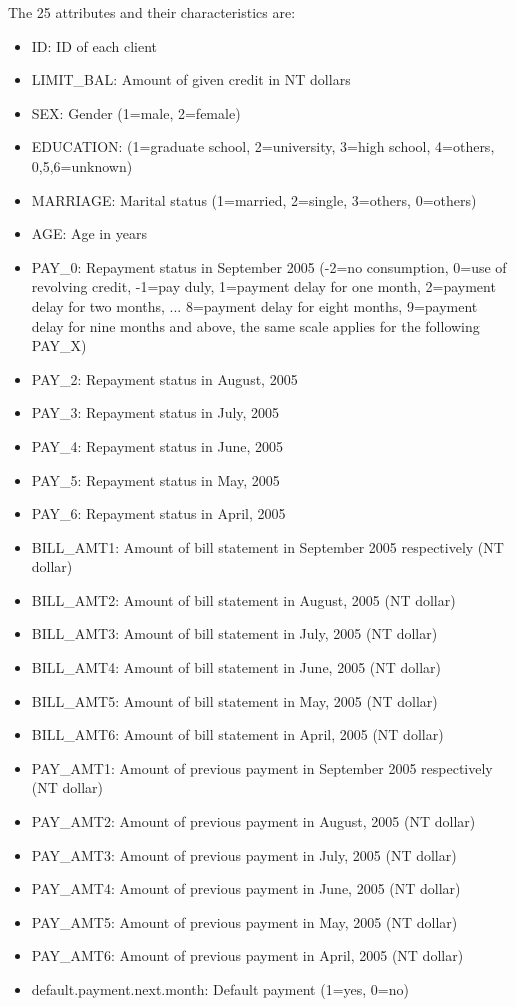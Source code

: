 \documentclass[fleqn,10pt]{SelfArx} %
\begin{document}
	The 25 attributes and their characteristics are:
	\begin{itemize}[noitemsep]
		\item ID: ID of each client
		\item LIMIT\_BAL: Amount of given credit in NT dollars
		\item SEX: Gender (1=male, 2=female)
		\item EDUCATION: (1=graduate school, 2=university, 3=high school, 4=others, 0,5,6=unknown)
		\item MARRIAGE: Marital status (1=married, 2=single, 3=others, 0=others)
		\item AGE: Age in years
		\item PAY\_0: Repayment status in September 2005 (-2=no consumption, 0=use of revolving credit, -1=pay duly, 1=payment delay for one month, 2=payment delay for two months, ... 8=payment delay for eight months, 9=payment delay for nine months and above, the same scale applies for the following PAY\_X)
		\item PAY\_2: Repayment status in August, 2005
		\item PAY\_3: Repayment status in July, 2005 
		\item PAY\_4: Repayment status in June, 2005 
		\item PAY\_5: Repayment status in May, 2005 
		\item PAY\_6: Repayment status in April, 2005 
		\item BILL\_AMT1: Amount of bill statement in September 2005 respectively (NT dollar)
		\item BILL\_AMT2: Amount of bill statement in August, 2005 (NT dollar)
		\item BILL\_AMT3: Amount of bill statement in July, 2005 (NT dollar)
		\item BILL\_AMT4: Amount of bill statement in June, 2005 (NT dollar)
		\item BILL\_AMT5: Amount of bill statement in May, 2005 (NT dollar)
		\item BILL\_AMT6: Amount of bill statement in April, 2005 (NT dollar)
		\item PAY\_AMT1: Amount of previous payment in September 2005 respectively (NT dollar)
		\item PAY\_AMT2: Amount of previous payment in August, 2005 (NT dollar)
		\item PAY\_AMT3: Amount of previous payment in July, 2005 (NT dollar)
		\item PAY\_AMT4: Amount of previous payment in June, 2005 (NT dollar)
		\item PAY\_AMT5: Amount of previous payment in May, 2005 (NT dollar)
		\item PAY\_AMT6: Amount of previous payment in April, 2005 (NT dollar)
		\item default.payment.next.month: Default payment (1=yes, 0=no)
	\end{itemize}
	
\end{document}
